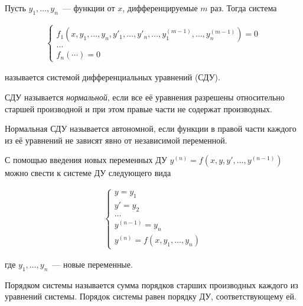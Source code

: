 
\begin{definition}
  Пусть \(y_{1}, \dots, y_{n}\)~--- функции от \(x\), дифференцируемые \(m\)
  раз. Тогда система

  \begin{align*}
    \begin{cases}
      f_{1}(x,
        y_{1}, \dotsc, y_{n},
        y'_{1}, \dotsc, y'_{n},
        \dotsc,
        y_{1}^{(m - 1)}, \dotsc, y_{n}^{(m - 1)}
      ) = 0 \\
      \dotsc \\
      f_{n} (\cdots) = 0
    \end{cases}
  \end{align*}

  называется системой дифференциальных уравнений (СДУ).
\end{definition}

\begin{definition}
  СДУ называется \textit{нормальной}, если все её уравнения разрешены
  относительно старшей производной и при этом правые части не содержат
  производных.
\end{definition}

\begin{definition}
  Нормальная СДУ называется автономной, если функции в правой части каждого из
  её уравнений не зависят явно от независимой переменной.
\end{definition}

\begin{remark}\label{de-to-sde}
  С помощью введения новых переменных ДУ
  \(y^{(n)} = f(x, y, y', \dotsc, y^{(n - 1)})\) можно свести к системе ДУ
  следующего вида

  \begin{align*}
    \begin{cases}
      y = y_{1} \\
      y' = y_{2} \\
      \dots \\
      y^{(n - 1)} = y_{n} \\
      y^{(n)} = f(x, y_{1}, \dotsc, y_{n})
    \end{cases}
  \end{align*}

  где \(y_{1}, \dotsc, y_{n}\)~--- новые переменные.
\end{remark}

\begin{definition}
  Порядком системы называется сумма порядков старших производных каждого из
  уравнений системы. Порядок системы равен порядку ДУ, соответствующему ей.
\end{definition}

